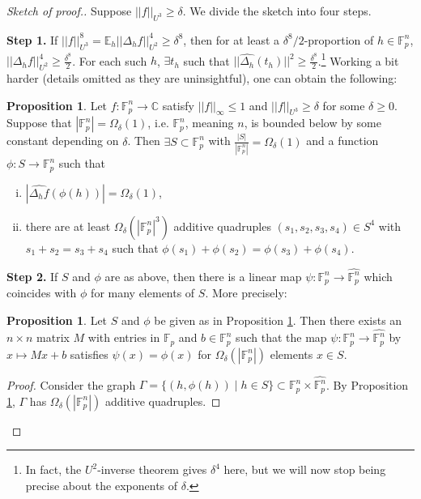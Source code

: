 \documentclass{article}
\theoremstyle{definition}
\newtheorem{prop}[theorem]{Proposition}
\begin{document}
\begin{proof}[Sketch of proof.]
    Suppose $||f||_{U^3}\ge \delta$. We divide the sketch into four steps.
    \vspace{1mm}
     
    \textbf{Step 1.} If $||f||_{U^3}^8 = \mathbb{E}_h ||\Delta_h f||_{U^2}^4\ge \delta^8$, then for at least a $\delta^8/2$-proportion of $h \in \mathbb{F}_p^n$, $||\Delta_h f||_{U^2}^4 \ge \frac{\delta^8}{2}$. For each such $h$, $\exists t_h$ such that $||\widehat{\Delta_h}(t_h)||^2\ge \frac{\delta^8}{2}$.\footnote{In fact, the $U^2$-inverse theorem gives $\delta^4$ here, but we will now stop being precise about the exponents of $\delta$.} Working a bit harder (details omitted as they are uninsightful), one can obtain the following:
    \begin{prop}\label{prop4.15}
        Let $f : \mathbb{F}_p^n \to \mathbb{C}$ satisfy $||f||_{\infty}\le 1$ and $||f||_{U^3}\ge \delta$ for some $\delta\ge 0$. Suppose that $\left|\mathbb{F}_p^n\right| = \Omega_{\delta}(1)$, i.e. $\mathbb{F}_p^n$, meaning $n$, is bounded below by some constant depending on $\delta$. Then $\exists S \subset \mathbb{F}_p^n$ with $\frac{\left|S\right|}{\left|\mathbb{F}_p^n\right|} = \Omega_{\delta}(1)$ and a function $\phi: S \to \mathbb{F}_p^n$ such that
        \begin{enumerate}[(i)]
            \item $\left|\widehat{\Delta_hf}(\phi(h))\right| = \Omega_\delta(1)$,
            \item there are at least $\Omega_{\delta}(\left|\mathbb{F}_p^n\right|^3)$ additive quadruples $(s_1,s_2,s_3,s_4) \in S^4$ with $s_1+s_2=s_3+s_4$ such that $\phi(s_1)+\phi(s_2)=\phi(s_3)+\phi(s_4)$.
        \end{enumerate}
    \end{prop}
    \textbf{Step 2.} If $S$ and $\phi$ are as above, then there is a linear map $\psi : \mathbb{F}_p^n \to \widehat{\mathbb{F}_p^n}$ which coincides with $\phi$ for many elements of $S$. More precisely:
    \begin{prop}\label{prop4.16}
        Let $S$ and $\phi$ be given as in Proposition \ref{prop4.15}. Then there exists an $n \times n$ matrix $M$ with entries in $\mathbb{F}_p$ and $b \in \mathbb{F}_p^n$ such that the map $\psi : \mathbb{F}_p^n \to \widehat{\mathbb{F}_p^n}$ by $x \mapsto Mx+b$ satisfies $\psi(x)=\phi(x)$ for $\Omega_\delta(\left|\mathbb{F}_p^n\right|)$ elements $x \in S$.
    \end{prop}
    \begin{proof}
        Consider the graph $\Gamma = \{(h,\phi(h)) \mid h \in S\} \subset \mathbb{F}_p^n \times \widehat{\mathbb{F}_p^n}$. By Proposition \ref{prop4.15}, $\Gamma$ has $\Omega_\delta(\left|\mathbb{F}_p^n\right|)$ additive quadruples.
        \vspace{1mm}
         

\end{proof}
\end{proof}
\end{document}

